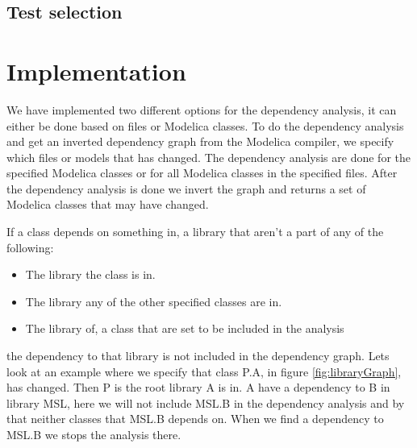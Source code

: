 \documentclass{cslthse-msc}
\begin{document}
\section{Test selection}

\chapter[Implementation]{Implementation}
We have implemented two different options for the dependency analysis, it can either be done based on files or Modelica classes. To do the dependency analysis and get an inverted dependency graph from the Modelica compiler, we specify which files or models that has changed. The dependency analysis are done for the specified Modelica classes or for all Modelica classes in the specified files. After the dependency analysis is done we invert the graph and returns a set of Modelica classes that may have changed.

If a class depends on something in, a library that aren't a part of any of the following: 
\begin{itemize}
	\item The library the class is in.
	\item The library any of the other specified classes are in.
	\item The library of, a class that are set to be included in the analysis
\end{itemize}
the dependency to that library is not included in the dependency graph. Lets look at an example where we specify that class P.A, in figure \ref{fig:libraryGraph}, has changed. Then P is the root library A is in. A have a dependency to B in library MSL, here we will not include MSL.B in the dependency analysis and by that neither classes that MSL.B depends on. When we find a dependency to MSL.B we stops the analysis there.
\end{document}
